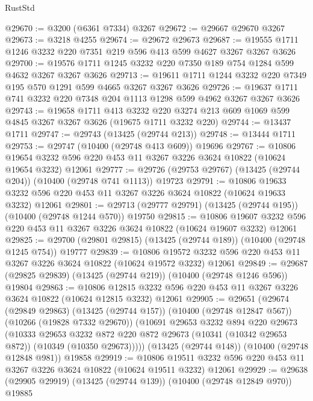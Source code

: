 \begin{lexlean}{RustStd}
\begin{coremodule}
@29670 := @3200 (@6361 @7334) @3267
@29672 := @29667 @29670 @3267
@29673 := @3218 @4255
@29674 := @29672 @29673
@29687 := @19555 @1711 @1246 @3232 @220 @7351 @219 @596 @413 @599 @4627 @3267 @3267 @3626
@29700 := @19576 @1711 @1245 @3232 @220 @7350 @189 @754 @1284 @599 @4632 @3267 @3267 @3626
@29713 := @19611 @1711 @1244 @3232 @220 @7349 @195 @570 @1291 @599 @4665 @3267 @3267 @3626
@29726 := @19637 @1711 @741 @3232 @220 @7348 @204 @1113 @1298 @599 @4962 @3267 @3267 @3626
@29743 := @19658
    @1711
    @413
    @3232
    @220
    @3274
    @213
    @609
    @1069
    @599
    @4845
    @3267
    @3267
    @3626
    (@19675 @1711 @3232 @220)
@29744 := @13437 @1711
@29747 := @29743 (@13425 (@29744 @213))
@29748 := @13444 @1711
@29753 := @29747 (@10400 (@29748 @413 @609)) @19696
@29767 := @10806
    @19654
    @3232
    @596
    @220
    @453
    @11
    @3267
    @3226
    @3624
    @10822
    (@10624 @19654 @3232)
    @12061
@29777 := @29726 (@29753 @29767) (@13425 (@29744 @204)) (@10400 (@29748 @741 @1113)) @19723
@29791 := @10806
    @19633
    @3232
    @596
    @220
    @453
    @11
    @3267
    @3226
    @3624
    @10822
    (@10624 @19633 @3232)
    @12061
@29801 := @29713 (@29777 @29791) (@13425 (@29744 @195)) (@10400 (@29748 @1244 @570)) @19750
@29815 := @10806
    @19607
    @3232
    @596
    @220
    @453
    @11
    @3267
    @3226
    @3624
    @10822
    (@10624 @19607 @3232)
    @12061
@29825 := @29700 (@29801 @29815) (@13425 (@29744 @189)) (@10400 (@29748 @1245 @754)) @19777
@29839 := @10806
    @19572
    @3232
    @596
    @220
    @453
    @11
    @3267
    @3226
    @3624
    @10822
    (@10624 @19572 @3232)
    @12061
@29849 := @29687 (@29825 @29839) (@13425 (@29744 @219)) (@10400 (@29748 @1246 @596)) @19804
@29863 := @10806
    @12815
    @3232
    @596
    @220
    @453
    @11
    @3267
    @3226
    @3624
    @10822
    (@10624 @12815 @3232)
    @12061
@29905 := @29651
    (@29674
      (@29849 @29863)
      (@13425 (@29744 @157))
      (@10400 (@29748 @12847 @567))
      (@10266 (@19828 @7332 @29670))
      (@10691
        @29653
        @3232
        @894
        @220
        @29673
        (@10333
          @29653
          @3232
          @872
          @220
          @872
          @29673
          (@10341 (@10342 @29653 @872))
          (@10349 (@10350 @29673)))))
    (@13425 (@29744 @148))
    (@10400 (@29748 @12848 @981))
    @19858
@29919 := @10806
    @19511
    @3232
    @596
    @220
    @453
    @11
    @3267
    @3226
    @3624
    @10822
    (@10624 @19511 @3232)
    @12061
@29929 := @29638 (@29905 @29919) (@13425 (@29744 @139)) (@10400 (@29748 @12849 @970)) @19885

\end{coremodule}
\end{lexlean}
